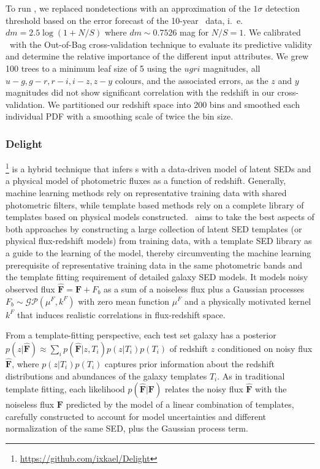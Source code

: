 To run \tpz, we replaced nondetections with an approximation of the $1\sigma$ detection threshold based on the error forecast of the 10-year \lsst\ data, i.~e. $dm = 2.5 \log (1 + N/S)$ where $dm \sim 0.7526$ mag for $N/S = 1$.
We calibrated \tpz\ with the Out-of-Bag cross-validation technique \citep{Breiman:84,Carrasco_Kind:13} to evaluate its predictive validity and determine the relative importance of the different input attributes.
We grew 100 trees to a minimum leaf size of 5 using the $ugri$ magnitudes, all $u-g, g-r, r-i, i-z, z-y$ colours, and the associated errors, as the $z$ and $y$ magnitudes did not show significant correlation with the redshift in our cross-validation.
We partitioned our redshift space into 200 bins and smoothed each individual PDF with a smoothing scale of twice the bin size.

\subsubsection{Delight}

\delight \footnote{\url{https://github.com/ixkael/Delight}} \citep{Leistedt:17} is a hybrid technique that infers \pz s with a data-driven model of latent SEDs and a physical model of photometric fluxes as a function of redshift.
Generally, machine learning methods rely on representative training data with shared photometric filters, while template based methods rely on a complete library of templates based on physical models constructed.
\delight\ aims to take the best aspects of both approaches by constructing a large collection of latent SED templates (or physical flux-redshift models) from training data, with a template SED library as a guide to the learning of the model, thereby circumventing the machine learning prerequisite of representative training data in the same photometric bands and the template fitting requirement of detailed galaxy SED models.
It models noisy observed flux $\mathbf{\hat{F}} = \mathbf{F} + F_{b}$ as a sum of a noiseless flux plus a Gaussian processes $F_b \sim \mathcal{GP}\left(\mu^F, k^F \right)$ with zero mean function $\mu^{F}$ and a physically motivated kernel $k^{F}$ that induces realistic correlations in flux-redshift space.

From a template-fitting perspective, each test set galaxy has a posterior $p(z \vert \mathbf{\hat{F}}) \approx \sum_i p(\mathbf{\hat{F}} \vert z, T_i) p(z \vert T_i) p(T_i)$ of redshift $z$ conditioned on noisy flux $\mathbf{\hat{F}}$, where $p(z \vert T_i) p(T_i)$ captures prior information about the redshift distributions and abundances of the galaxy templates $T_i$.
As in traditional template fitting, each likelihood $p(\mathbf{\hat{F}} \vert \mathbf{F})$ relates the noisy flux $\mathbf{\hat{F}}$ with the noiseless flux $\mathbf{F}$ predicted by the model of a linear combination of templates, carefully constructed to account for model uncertainties and different normalization of the same SED, plus the Gaussian process term.

